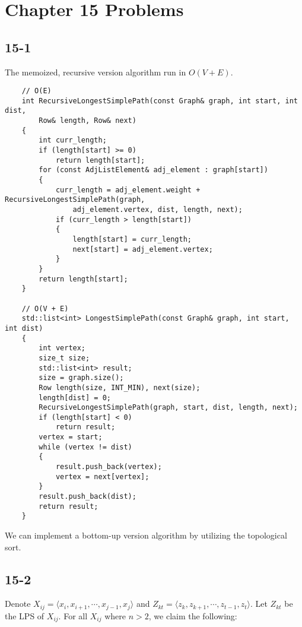 \section*{Chapter 15 Problems}

\subsection*{15-1}

The memoized, recursive version algorithm run in $O(V+E)$.

\begin{verbatim}
    // O(E)
    int RecursiveLongestSimplePath(const Graph& graph, int start, int dist, 
        Row& length, Row& next)
    {
        int curr_length;
        if (length[start] >= 0)
            return length[start];
        for (const AdjListElement& adj_element : graph[start])
        {
            curr_length = adj_element.weight + RecursiveLongestSimplePath(graph, 
                adj_element.vertex, dist, length, next);
            if (curr_length > length[start])
            {
                length[start] = curr_length;
                next[start] = adj_element.vertex;
            }
        }
        return length[start];
    }

    // O(V + E)
    std::list<int> LongestSimplePath(const Graph& graph, int start, int dist)
    {
        int vertex;
        size_t size;
        std::list<int> result;
        size = graph.size();
        Row length(size, INT_MIN), next(size);
        length[dist] = 0;
        RecursiveLongestSimplePath(graph, start, dist, length, next);
        if (length[start] < 0)
            return result;
        vertex = start;
        while (vertex != dist)
        {
            result.push_back(vertex);
            vertex = next[vertex];
        }
        result.push_back(dist);
        return result;
    }
\end{verbatim}

We can implement a bottom-up version algorithm 
by utilizing the topological sort.

\subsection*{15-2}

Denote $X_{ij} = \langle x_i, x_{i+1}, \cdots, x_{j-1}, x_j \rangle$
and $Z_{kt} = \langle z_k, z_{k+1}, \cdots, z_{t-1}, z_t \rangle$. 
Let $Z_{kt}$ be the LPS of $X_{ij}$. 
For all $X_{ij}$ where $n > 2$, 
we claim the following:


